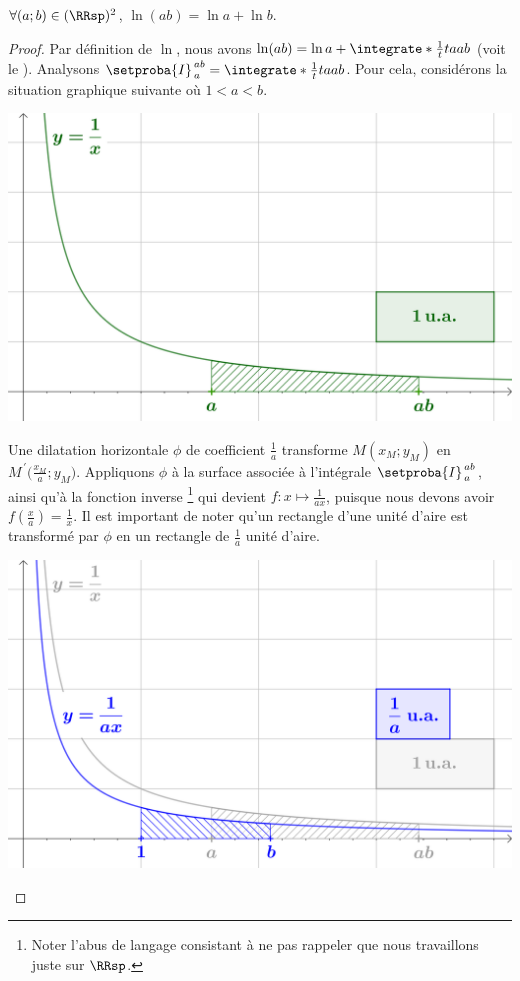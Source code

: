 \begin{fact}
    $\forall (a;b) \in ( \RRsp )^2$,
    $\ln(a b) = \ln a + \ln b$.
\end{fact}


\begin{proof}
    Par définition de $\ln$, nous avons
    $\ln(a b) = \ln a + \integrate*{\frac1t}{t}{a}{ab}$
    (voit le ).
    Analysons $\setproba{I}_{\,a}^{\,ab} = \integrate*{\frac1t}{t}{a}{ab}$.
    Pour cela, considérons la situation graphique suivante où $1 < a < b$.

    \begin{center}
        \includegraphics[scale=.5]{content/ln/func-eq-1.png}
    \end{center}

    Une dilatation horizontale $\phi$ de coefficient $\frac1a$ transforme $M(x_M ; y_M)$ en $M^{\,\prime}\big( \frac{x_M}{a} ; y_M)$.
    Appliquons $\phi$ à la surface associée à l'intégrale $\setproba{I}_{\,a}^{\,ab}$, ainsi qu'à la fonction inverse%
    \footnote{
        Noter l'abus de langage consistant à ne pas rappeler que nous travaillons juste sur $\RRsp$.
    }
    qui devient $f: x \mapsto \frac{1}{a x}$, puisque nous devons avoir $f(\frac{x}{a}) = \frac{1}{x}$.
    Il est important de noter qu'un rectangle d'une unité d'aire est transformé par $\phi$ en un rectangle de $\frac1a$ unité d'aire.

    \begin{center}
        \includegraphics[scale=.5]{content/ln/func-eq-2.png}
    \end{center}


\end{proof}
